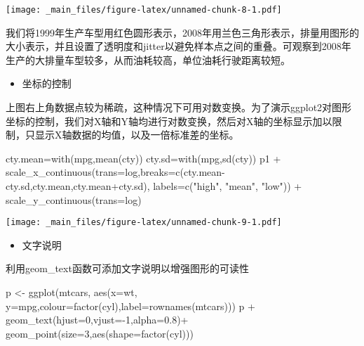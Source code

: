 \documentclass[
]{book}
\newenvironment{Shaded}{\begin{snugshade}}{\end{snugshade}}
\newcommand{\AttributeTok}[1]{\textcolor[rgb]{0.77,0.63,0.00}{#1}}
\newcommand{\DecValTok}[1]{\textcolor[rgb]{0.00,0.00,0.81}{#1}}
\newcommand{\FloatTok}[1]{\textcolor[rgb]{0.00,0.00,0.81}{#1}}
\newcommand{\FunctionTok}[1]{\textcolor[rgb]{0.00,0.00,0.00}{#1}}
\newcommand{\NormalTok}[1]{#1}
\newcommand{\OtherTok}[1]{\textcolor[rgb]{0.56,0.35,0.01}{#1}}
\newcommand{\SpecialCharTok}[1]{\textcolor[rgb]{0.00,0.00,0.00}{#1}}
\newcommand{\StringTok}[1]{\textcolor[rgb]{0.31,0.60,0.02}{#1}}
\providecommand{\tightlist}{%
  \setlength{\itemsep}{0pt}\setlength{\parskip}{0pt}}
\begin{document}
\texttt{[image: \_main\_files/figure-latex/unnamed-chunk-8-1.pdf]}

我们将1999年生产车型用红色圆形表示，2008年用兰色三角形表示，排量用图形的大小表示，并且设置了透明度和jitter以避免样本点之间的重叠。可观察到2008年生产的大排量车型较多，从而油耗较高，单位油耗行驶距离较短。

\begin{itemize}
\tightlist
\item
  坐标的控制
\end{itemize}

上图右上角数据点较为稀疏，这种情况下可用对数变换。为了演示ggplot2对图形坐标的控制，我们对X轴和Y轴均进行对数变换，然后对X轴的坐标显示加以限制，只显示X轴数据的均值，以及一倍标准差的坐标。

\begin{Shaded}
\begin{Highlighting}[]
\NormalTok{cty.mean}\OtherTok{=}\FunctionTok{with}\NormalTok{(mpg,}\FunctionTok{mean}\NormalTok{(cty))}
\NormalTok{cty.sd}\OtherTok{=}\FunctionTok{with}\NormalTok{(mpg,}\FunctionTok{sd}\NormalTok{(cty))}
\NormalTok{p1 }\SpecialCharTok{+} \FunctionTok{scale\_x\_continuous}\NormalTok{(}\AttributeTok{trans=}\StringTok{\textquotesingle{}log\textquotesingle{}}\NormalTok{,}\AttributeTok{breaks=}\FunctionTok{c}\NormalTok{(cty.mean}\SpecialCharTok{{-}}\NormalTok{cty.sd,cty.mean,cty.mean}\SpecialCharTok{+}\NormalTok{cty.sd), }\AttributeTok{labels=}\FunctionTok{c}\NormalTok{(}\StringTok{"high"}\NormalTok{, }\StringTok{"mean"}\NormalTok{, }\StringTok{"low"}\NormalTok{)) }\SpecialCharTok{+} \FunctionTok{scale\_y\_continuous}\NormalTok{(}\AttributeTok{trans=}\StringTok{\textquotesingle{}log\textquotesingle{}}\NormalTok{)}
\end{Highlighting}
\end{Shaded}

\texttt{[image: \_main\_files/figure-latex/unnamed-chunk-9-1.pdf]}

\begin{itemize}
\tightlist
\item
  文字说明
\end{itemize}

利用geom\_text函数可添加文字说明以增强图形的可读性

\begin{Shaded}
\begin{Highlighting}[]
\NormalTok{p }\OtherTok{\textless{}{-}} \FunctionTok{ggplot}\NormalTok{(mtcars, }\FunctionTok{aes}\NormalTok{(}\AttributeTok{x=}\NormalTok{wt, }\AttributeTok{y=}\NormalTok{mpg,}\AttributeTok{colour=}\FunctionTok{factor}\NormalTok{(cyl),}\AttributeTok{label=}\FunctionTok{rownames}\NormalTok{(mtcars)))}
\NormalTok{p }\SpecialCharTok{+} \FunctionTok{geom\_text}\NormalTok{(}\AttributeTok{hjust=}\DecValTok{0}\NormalTok{,}\AttributeTok{vjust=}\SpecialCharTok{{-}}\DecValTok{1}\NormalTok{,}\AttributeTok{alpha=}\FloatTok{0.8}\NormalTok{)}\SpecialCharTok{+} \FunctionTok{geom\_point}\NormalTok{(}\AttributeTok{size=}\DecValTok{3}\NormalTok{,}\FunctionTok{aes}\NormalTok{(}\AttributeTok{shape=}\FunctionTok{factor}\NormalTok{(cyl)))}
\end{Highlighting}
\end{Shaded}
\end{document}

